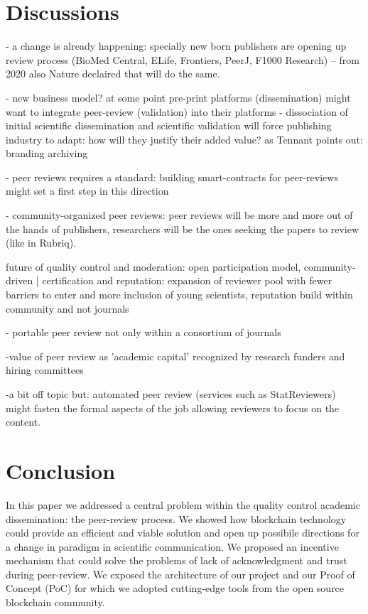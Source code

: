 \documentclass[runningheads]{llncs}
\begin{document}
\section{Discussions}

- a change is already happening: specially new born publishers are opening up review process (BioMed Central, ELife, Frontiers, PeerJ, F1000 Research) -- from 2020 also Nature declaired that will do the same. 

- new business model? at some point pre-print platforms (dissemination) might want to integrate peer-review (validation) into their platforms - dissociation of initial scientific dissemination and scientific validation will force publishing industry to adapt: how will they justify their added value? as Tennant points out: branding archiving 

- peer reviews requires a standard: building smart-contracts for peer-reviews might set a first step in this direction 

- community-organized peer  reviews: peer reviews will be more and more out of the hands of publishers, researchers will be the ones seeking the papers to review (like in Rubriq). 

future of quality control and moderation: open participation model, community-driven | certification and reputation: expansion of reviewer pool with fewer barriers to enter and more inclusion of young scientists, reputation build within community and not journals 

- portable peer review not only within a consortium of journals 

-value of peer review as 'academic capital' recognized by research funders and hiring committees

-a bit off topic but: automated peer review (services such as StatReviewers) might fasten the formal aspects of the job allowing reviewers to focus on the content.

\section{Conclusion}
In this paper we addressed a central problem within the quality control academic dissemination: the peer-review process. We showed how blockchain technology could provide an efficient and viable solution and open up possibile directions for a change in paradigm in scientific communication. We proposed an incentive mechanism that could solve the problems of lack of acknowledgment and trust during peer-review. We exposed the architecture of our project and our Proof of Concept (PoC) for which we adopted cutting-edge tools from the open source blockchain community.
\end{document}
